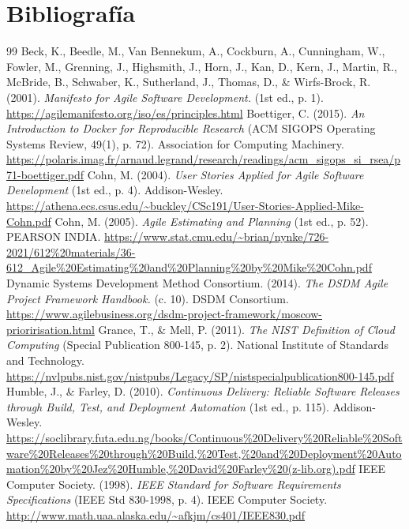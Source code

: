 \section*{Bibliografía}

\begin{thebibliography}{99}
	Beck, K., Beedle, M., Van Bennekum, A., Cockburn, A., Cunningham, W., Fowler, M., Grenning, J., Highsmith, J., Horn, J., Kan, D., Kern, J., Martin, R., McBride, B., Schwaber, K., Sutherland, J., Thomas, D., \& Wirfs-Brock, R. (2001).
	\textit{Manifesto for Agile Software Development.} (1st ed., p. 1).
	\url{https://agilemanifesto.org/iso/es/principles.html}
	Boettiger, C. (2015).
	\textit{An Introduction to Docker for Reproducible Research} (ACM SIGOPS Operating Systems Review, 49(1), p. 72).
	Association for Computing Machinery.
	\url{https://polaris.imag.fr/arnaud.legrand/research/readings/acm_sigops_si_rsea/p71-boettiger.pdf}
	Cohn, M. (2004).
	\textit{User Stories Applied for Agile Software Development} (1st ed., p. 4).
	Addison-Wesley.
	\url{https://athena.ecs.csus.edu/~buckley/CSc191/User-Stories-Applied-Mike-Cohn.pdf}
	Cohn, M. (2005).
	\textit{Agile Estimating and Planning} (1st ed., p. 52).
	PEARSON INDIA.
	\url{https://www.stat.cmu.edu/~brian/nynke/726-2021/612%20materials/36-612_Agile%20Estimating%20and%20Planning%20by%20Mike%20Cohn.pdf}
	Dynamic Systems Development Method Consortium. (2014).
	\textit{The DSDM Agile Project Framework Handbook.} (c. 10).
	DSDM Consortium.
	\url{https://www.agilebusiness.org/dsdm-project-framework/moscow-prioririsation.html}
	Grance, T., \& Mell, P. (2011).
	\textit{The NIST Definition of Cloud Computing} (Special Publication 800-145, p. 2).
	National Institute of Standards and Technology.
	\url{https://nvlpubs.nist.gov/nistpubs/Legacy/SP/nistspecialpublication800-145.pdf}
	Humble, J., \& Farley, D. (2010).
	\textit{Continuous Delivery: Reliable Software Releases through Build, Test, and Deployment Automation} (1st ed., p. 115).
	Addison-Wesley.
	\url{https://soclibrary.futa.edu.ng/books/Continuous%20Delivery%20Reliable%20Software%20Releases%20through%20Build,%20Test,%20and%20Deployment%20Automation%20by%20Jez%20Humble,%20David%20Farley%20(z-lib.org).pdf}
	IEEE Computer Society. (1998).
	\textit{IEEE Standard for Software Requirements Specifications} (IEEE Std 830-1998, p. 4).
	IEEE Computer Society.
	\url{http://www.math.uaa.alaska.edu/~afkjm/cs401/IEEE830.pdf}

\end{thebibliography}
